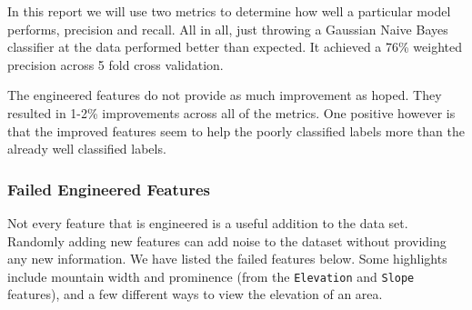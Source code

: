\documentclass[11pt]{article}
\begin{document}
    In this report we will use two metrics to determine how well a
particular model performs, precision and recall. All in all, just
throwing a Gaussian Naive Bayes classifier at the data performed better
than expected. It achieved a 76\% weighted precision across 5 fold cross
validation.

The engineered features do not provide as much improvement as hoped.
They resulted in 1-2\% improvements across all of the metrics. One
positive however is that the improved features seem to help the poorly
classified labels more than the already well classified labels.

    \subsubsection{Failed Engineered
Features}\label{failed-engineered-features}

    Not every feature that is engineered is a useful addition to the data
set. Randomly adding new features can add noise to the dataset without
providing any new information. We have listed the failed features below.
Some highlights include mountain width and prominence (from the
\texttt{Elevation} and \texttt{Slope} features), and a few different
ways to view the elevation of an area.
\end{document}
